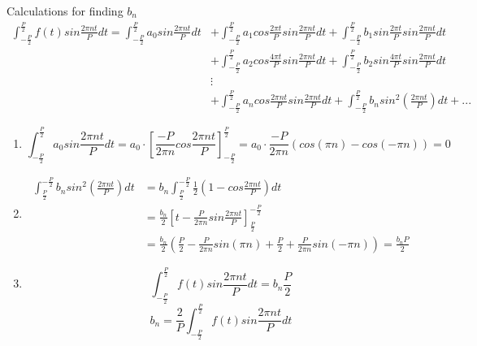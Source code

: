 \documentclass[titlepage]{article}
\begin{document}
    Calculations for finding $b_n$
    \begin{equation*}
    \begin{split}
        \int_{-\frac{P}{2}}^{\frac{P}{2}}f(t)sin\frac{2\pi nt}{P}dt 
        = \int_{-\frac{P}{2}}^{\frac{P}{2}}a_0sin\frac{2\pi nt}{P}dt 
        & +\int_{-\frac{P}{2}}^{\frac{P}{2}}a_1cos\frac{2\pi t}{P}sin\frac{2\pi nt}{P}dt +
        \int_{-\frac{P}{2}}^{\frac{P}{2}}b_1sin\frac{2\pi t}{P}sin\frac{2\pi nt}{P}dt \\
        & + \int_{-\frac{P}{2}}^{\frac{P}{2}}a_2cos\frac{4\pi t}{P}sin\frac{2\pi nt}{P}dt +
        \int_{-\frac{P}{2}}^{\frac{P}{2}}b_2sin\frac{4\pi t}{P}sin\frac{2\pi nt}{P}dt \\
        & \vdots \\
        & + \int_{-\frac{P}{2}}^{\frac{P}{2}}a_ncos\frac{2\pi nt}{P}sin\frac{2\pi nt}{P}dt +
        \int_{-\frac{P}{2}}^{\frac{P}{2}}b_nsin^2(\frac{2\pi nt}{P})dt 
        + ...
    \end{split}
    \end{equation*}
    \begin{enumerate}
        \item 
            \begin{equation*}
                \int_{-\frac{P}{2}}^{\frac{P}{2}}a_0sin\frac{2\pi nt}{P}dt
                = a_0 \cdot \left[\frac{-P}{2\pi n}cos\frac{2\pi nt}{P}\right]_{-\frac{P}{2}}^{\frac{P}{2}}
                = a_0 \cdot \frac{-P}{2\pi n}(cos(\pi n) - cos(-\pi n)) = 0
            \end{equation*}
        \item 
            \begin{equation*}
            \begin{split}
                \int_{\frac{P}{2}}^{-\frac{P}{2}} b_n sin^2(\frac{2\pi nt}{P})dt
                & = b_n \int_{\frac{P}{2}}^{-\frac{P}{2}} \frac{1}{2}(1 - cos\frac{2\pi nt}{P})dt \\
                & = \frac{b_n}{2}\left[ t - \frac{P}{2\pi n}sin\frac{2\pi nt}{P} 
                \right]_{\frac{P}{2}}^{-\frac{P}{2}} \\
                & = \frac{b_n}{2}\left( \frac{P}{2} - \frac{P}{2\pi n}sin(\pi n)
                + \frac{P}{2} + \frac{P}{2\pi n}sin(-\pi n) \right) = \frac{b_nP}{2}
            \end{split}
            \end{equation*}
        \item 
            \begin{equation*}
                \int_{-\frac{P}{2}}^{\frac{P}{2}}f(t)sin\frac{2\pi nt}{P}dt = 
                b_n\frac{P}{2}
            \end{equation*}
            \begin{equation*}
                b_n = \frac{2}{P}\int_{-\frac{P}{2}}^{\frac{P}{2}}f(t)sin\frac{2\pi nt}{P}dt
            \end{equation*}
            
    \end{enumerate}
\end{document}
